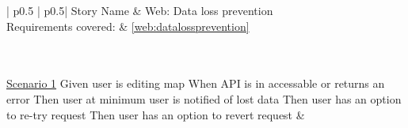 \begin{longtable}{| p{} | p{}|}
	\hline
	\newline Story Name & \newline Web: Data loss prevention\\\hline
	\newline Requirements covered: & \newline \ref{web:datalossprevention}\\\hline
	\\\hline
	\\\hline
	
	\newline\underline{Scenario 1}\newline
	Given user is editing map\newline
	When API is in accessable or returns an error\newline 
	Then user at minimum user is notified of lost data\newline
	Then user has an option to re-try request\newline
	Then user has an option to revert request\newline
	&
	\\\hline
\end{longtable}